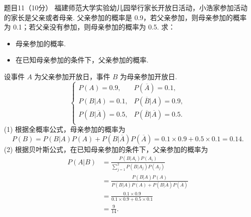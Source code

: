 \begin{question}{题目11（10分）}
    福建师范大学实验幼儿园举行家长开放日活动，小浩家参加活动的家长是父亲或者母亲. 父亲参加的概率是 0.9，若父亲参加，则母亲参加的概率为 0.1；若父亲没有参加，则母亲参加的概率为 0.5. 求：

    \begin{itemize}
        \item [(1)] 母亲参加的概率.
        \item [(2)] 在已知母亲参加的条件下，父亲参加的概率.
    \end{itemize}
\end{question}
\begin{solution}
    设事件 $A$ 为父亲参加开放日，事件 $B$ 为母亲参加开放日.
    $$
        \begin{cases}
            P(A) = 0.9,              & P(\overline{A}) = 0.1,              \\
            P(B|A) = 0.1,            & P(\overline{B}|A) = 0.9,            \\
            P(B|\overline{A}) = 0.5, & P(\overline{B}|\overline{A}) = 0.5. \\
        \end{cases}
    $$
    (1) 根据全概率公式，母亲参加的概率为
    $$
        P(B) = P(B|A)P(A) + P(B|\overline{A})P(\overline{A})
        = 0.1 \times 0.9 + 0.5 \times 0.1
        = 0.14.
    $$
    (2) 根据贝叶斯公式，在已知母亲参加的条件下，父亲参加的概率为
    $$
        \begin{aligned}
            P(A|B)
             & = \frac{P(B|A_i)P(A_i)}{\sum\limits_{j=1}^2 P(B|A_j)P(A_j)}        \\
             & = \frac{P(B|A)P(A)}{P(B|A)P(A) + P(B|\overline{A})P(\overline{A})} \\
             & = \frac{0.1 \times 0.9}{0.1 \times 0.9 + 0.5 \times 0.1}           \\
             & = \frac{9}{14}.                                                    \\
        \end{aligned}
    $$
\end{solution}


